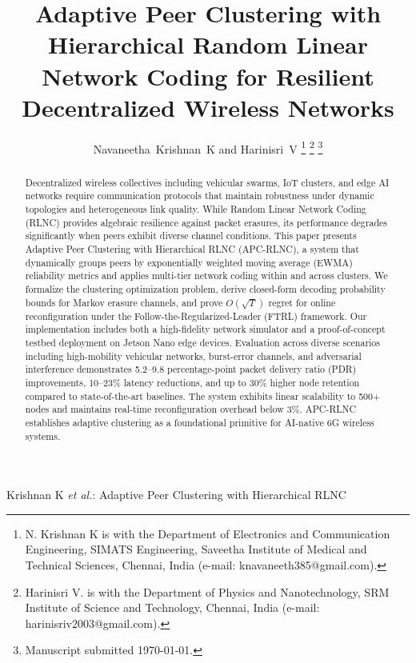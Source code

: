 \documentclass[journal]{IEEEtran}
\begin{document}
\title{Adaptive Peer Clustering with Hierarchical Random Linear Network Coding for Resilient Decentralized Wireless Networks}

\author{Navaneetha~Krishnan~K and Harinisri~V
\thanks{N. Krishnan K is with the Department of Electronics and Communication Engineering, SIMATS Engineering, Saveetha Institute of Medical and Technical Sciences, Chennai, India (e-mail: knavaneeth385@gmail.com).}
\thanks{Harinisri V. is with the Department of Physics and Nanotechnology, SRM Institute of Science and Technology, Chennai, India (e-mail: harinisriv2003@gmail.com).}
\thanks{Manuscript submitted \today.}
}

%
{Krishnan K \MakeLowercase{\textit{et al.}}: Adaptive Peer Clustering with Hierarchical RLNC}

\maketitle

\begin{abstract}
Decentralized wireless collectives including vehicular swarms, IoT clusters, and edge AI networks require communication protocols that maintain robustness under dynamic topologies and heterogeneous link quality. While Random Linear Network Coding (RLNC) provides algebraic resilience against packet erasures, its performance degrades significantly when peers exhibit diverse channel conditions. This paper presents Adaptive Peer Clustering with Hierarchical RLNC (APC-RLNC), a system that dynamically groups peers by exponentially weighted moving average (EWMA) reliability metrics and applies multi-tier network coding within and across clusters. We formalize the clustering optimization problem, derive closed-form decoding probability bounds for Markov erasure channels, and prove $O(\sqrt{T})$ regret for online reconfiguration under the Follow-the-Regularized-Leader (FTRL) framework. Our implementation includes both a high-fidelity network simulator and a proof-of-concept testbed deployment on Jetson Nano edge devices. Evaluation across diverse scenarios including high-mobility vehicular networks, burst-error channels, and adversarial interference demonstrates 5.2--9.8 percentage-point packet delivery ratio (PDR) improvements, 10--23\% latency reductions, and up to 30\% higher node retention compared to state-of-the-art baselines. The system exhibits linear scalability to 500+ nodes and maintains real-time reconfiguration overhead below 3\%. APC-RLNC establishes adaptive clustering as a foundational primitive for AI-native 6G wireless systems.
\end{abstract}
\end{document}
